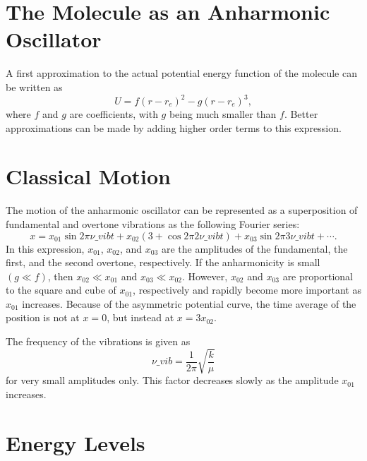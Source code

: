 \documentclass[11pt, twoside, fleqn]{report}
\begin{document}
\section{The Molecule as an Anharmonic Oscillator}
\label{s:the_molecule_as_an_anharmonic_oscillator}

A first approximation to the actual potential energy function of the molecule can be written as
\begin{equation*}
    U = f(r - r_e)^2 - g(r - r_e)^3,
\end{equation*}
where $f$ and $g$ are coefficients, with $g$ being much smaller than $f$. Better approximations can be made by adding higher order terms to this expression.

\section{Classical Motion}
\label{s:classical_motion}

The motion of the anharmonic oscillator can be represented as a superposition of fundamental and overtone vibrations as the following Fourier series:
\begin{equation*}
    x = x_{01}\sin{2\pi\nu\_{vib}t} + x_{02}(3 + \cos{2\pi2\nu\_{vib}t}) + x_{03}\sin{2\pi3\nu\_{vib}t} + \dotsb.
\end{equation*}
In this expression, $x_{01}$, $x_{02}$, and $x_{03}$ are the amplitudes of the fundamental, the first, and the second overtone, respectively. If the anharmonicity is small $(g \ll f)$, then $x_{02} \ll x_{01}$ and $x_{03} \ll x_{02}$. However, $x_{02}$ and $x_{03}$ are proportional to the square and cube of $x_{01}$, respectively and rapidly become more important as $x_{01}$ increases. Because of the asymmetric potential curve, the time average of the position is not at $x = 0$, but instead at $x = 3x_{02}$.

The frequency of the vibrations is given as
\begin{equation*}
    \nu\_{vib} = \frac{1}{2\pi}\sqrt{\frac{k}{\mu}}
\end{equation*}
for very small amplitudes only. This factor decreases slowly as the amplitude $x_{01}$ increases.

\section{Energy Levels}
\label{s:energy_levels_3}
\end{document}
